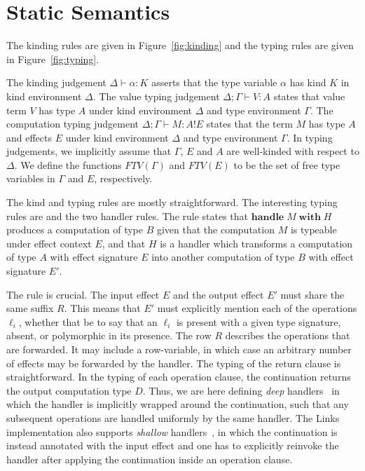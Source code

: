 \documentclass[mscres,cdtppar,twoside,openright,logo,rightchapter,normalheadings]{infthesis}
\theoremstyle{definition}
\newcommand{\tylab}[1]{\text{\scshape{T-#1}}}
\newcommand{\keyw}[1]{\textbf{#1}}
\newcommand{\Handle}{\keyw{handle}}
\newcommand{\With}{\keyw{with}}
\newcommand{\eff}{!}
\newcommand{\typv}[2]{#1 \vdash #2}
\newcommand{\typc}[3]{#1 \vdash #2 \eff #3}
\begin{document}
\section{Static Semantics}
\label{sec:typing}
The kinding rules are given in Figure~\ref{fig:kinding} and the typing
rules are given in Figure~\ref{fig:typing}.

The kinding judgement $\Delta \vdash \alpha : K$ asserts that the type
variable $\alpha$ has kind $K$ in kind environment $\Delta$. The value
typing judgement $\typv{\Delta;\Gamma}{V : A}$ states that value term
$V$ has type $A$ under kind environment $\Delta$ and type environment
$\Gamma$. The computation typing judgement $\typc{\Delta;\Gamma}{M :
  A}{E}$ states that the term $M$ has type $A$ and effects $E$ under
kind environment $\Delta$ and type environment $\Gamma$. In typing
judgements, we implicitly assume that $\Gamma$, $E$ and $A$ are
well-kinded with respect to $\Delta$. We define the functions
$FTV(\Gamma)$ and $FTV(E)$ to be the set of free type variables in
$\Gamma$ and $E$, respectively.
%

The kind and typing rules are mostly straightforward. The interesting
typing rules are \tylab{Handle} and the two handler rules. The
\tylab{Handle} rule states that $\Handle\; M\; \With\; H$ produces a
computation of type $B$ given that the computation $M$ is typeable
under effect context $E$, and that $H$ is a handler which transforms a
computation of type $A$ with effect signature $E$ into another
computation of type $B$ with effect signature $E'$.

The \tylab{Handler} rule is crucial. The input effect $E$ and the
output effect $E'$ must share the same suffix $R$. This means that
$E'$ must explicitly mention each of the operations $\ell_i$, whether
that be to say that an $\ell_i$ is present with a given type
signature, absent, or polymorphic in its presence. The row $R$
describes the operations that are forwarded. It may include a
row-variable, in which case an arbitrary number of effects may be
forwarded by the handler.
%
The typing of the return clause is straightforward. In the typing of
each operation clause, the continuation returns the output computation
type $D$. Thus, we are here defining \emph{deep}
handlers~\cite{Kammar2013} in which the handler is implicitly wrapped
around the continuation, such that any subsequent operations are
handled uniformly by the same handler.
%
The Links implementation also supports \emph{shallow}
handlers~\cite{Kammar2013}, in which the continuation is instead
annotated with the input effect and one has to explicitly reinvoke the
handler after applying the continuation inside an operation clause.
\end{document}
